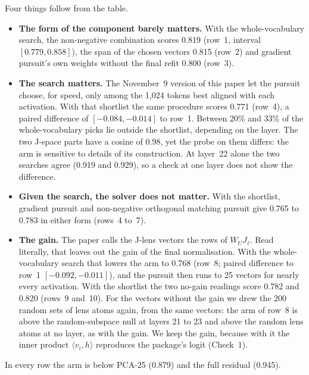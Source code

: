 \noindent Four things follow from the table.
\begin{itemize}
\item \textbf{The form of the component barely matters.} With the whole-vocabulary search, the non-negative combination
scores 0.819 (row~1, interval $[0.779, 0.858]$), the span of the chosen vectors 0.815 (row~2) and gradient pursuit's own
weights without the final refit 0.800 (row~3).
\item \textbf{The search matters.} The November~9 version of this paper let the pursuit choose, for speed, only among the
1{,}024 tokens best aligned with each activation. With that shortlist the same procedure scores 0.771 (row~4), a paired
difference of $[-0.084, -0.014]$ to row~1. Between 20\% and 33\% of the whole-vocabulary picks lie outside the shortlist,
depending on the layer. The two J-space parts have a cosine of 0.98, yet the probe on them differs: the arm is sensitive to
details of its construction. At layer~22 alone the two searches agree (0.919 and 0.929), so a check at one layer does not
show the difference.
\item \textbf{Given the search, the solver does not matter.} With the shortlist, gradient pursuit and non-negative
orthogonal matching pursuit give 0.765 to 0.783 in either form (rows~4 to~7).
\item \textbf{The gain.} The paper calls the J-lens vectors the rows of $W_U J_\ell$. Read literally, that leaves out the
gain of the final normalisation. With the whole-vocabulary search that lowers the arm to 0.768 (row~8; paired difference
to row~1 $[-0.092, -0.011]$), and the pursuit then runs to 25 vectors for nearly every activation. With the shortlist the
two no-gain readings score 0.782 and 0.820 (rows~9 and~10). For the vectors without the gain we drew the 200 random sets of
lens atoms again, from the same vectors: the arm of row~8 is above the random-subspace null at layers 21 to 23 and above
the random lens atoms at no layer, as with the gain. We keep the gain, because with it the inner product
$\langle v_i,h\rangle$ reproduces the package's logit (Check~1).
\end{itemize}
In every row the arm is below PCA-25 (0.879) and the full residual (0.945).

